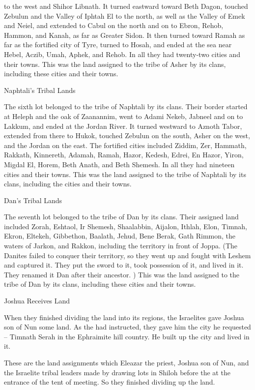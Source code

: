 {to the west
and Shihor Libnath.
It turned
eastward
toward
Beth Dagon,
touched
Zebulun
and the Valley
of Iphtah El
to the north,
as well as the Valley of Emek
and Neiel,
and extended
to
Cabul
on the north
and on to Ebron,
Rehob,
Hammon,
and Kanah,
as far
as Greater
Sidon.
It then turned
toward Ramah
as far as
the fortified
city
of Tyre,
turned
to Hosah,
and ended
at the sea
near Hebel, Aczib,
Umah,
Aphek,
and Rehob.
In all they had twenty-two
cities
and their towns.
This
was the land assigned
to the tribe
of Asher
by its clans,
including these
cities
and their towns.
\par }{\SH Naphtali’s Tribal Lands
\par }{\PP {}The sixth
lot
belonged
to the tribe
of Naphtali
by its clans.
Their border
started
at Heleph
and the oak
of Zaanannim,
went to Adami
Nekeb,
Jabneel
and on to
Lakkum,
and ended at
the Jordan River.
It turned
westward
to Aznoth Tabor,
extended from
there
to Hukok,
touched
Zebulun
on
the south,
Asher
on the west,
and the Jordan
on the east.
The fortified
cities
included Ziddim,
Zer,
Hammath,
Rakkath,
Kinnereth,
Adamah,
Ramah,
Hazor,
Kedesh,
Edrei,
En Hazor,
Yiron,
Migdal El,
Horem,
Beth Anath,
and Beth Shemesh.
In all they had nineteen
cities
and their towns.
This
was the land assigned
to the tribe
of Naphtali
by its clans,
including the cities
and their towns.
\par }{\SH Dan’s Tribal Lands
\par }{\PP {}The seventh
lot
belonged
to the tribe
of Dan
by its clans.
Their assigned land
included
Zorah,
Eshtaol,
Ir Shemesh,
Shaalabbin,
Aijalon,
Ithlah,
Elon,
Timnah,
Ekron,
Eltekeh,
Gibbethon,
Baalath,
Jehud,
Bene Berak,
Gath Rimmon,
the waters of Jarkon,
and Rakkon,
including the territory
in front
of Joppa.
(The Danites
failed
to conquer their territory,
so they
went up
and fought
with
Leshem
and captured
it. They put
the sword
to it, took possession
of it, and lived
in it.
They renamed
it Dan
after their ancestor. )
This
was the land assigned
to the tribe
of Dan
by its clans,
including these
cities
and their towns.
\par }{\SH Joshua Receives Land
\par }{\PP {}When they finished
dividing
the land
into its regions,
the Israelites
gave
Joshua
son
of Nun
some land.
As
the {}
had instructed,
they gave
him the city
he requested
– Timnath
Serah in the Ephraimite
hill country.
He built
up the city
and lived in it.
\par }{\PP {}These
are the land
assignments
which
Eleazar
the priest,
Joshua
son
of Nun,
and the Israelite
tribal leaders
made by drawing lots
in Shiloh
before
the {}
at the entrance
of the tent
of meeting.
So they finished
dividing up
the land.

}
